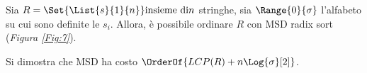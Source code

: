 \documentclass{subfiles}
\begin{document}
Sia \(R = \Set{\List{s}{1}{n}} \text{insieme di} n\) stringhe, sia \(\Range{0}{\sigma}\) l'alfabeto su cui sono definite le \(s_{i}\).
Allora, è possibile ordinare \(R\) con MSD radix sort (\emph{Figura \ref{Fig:7}}).


\noindent Si dimostra che MSD ha costo \(\OrderOf{LCP(R) + n\Log{\sigma}[2]}\).
\end{document}
